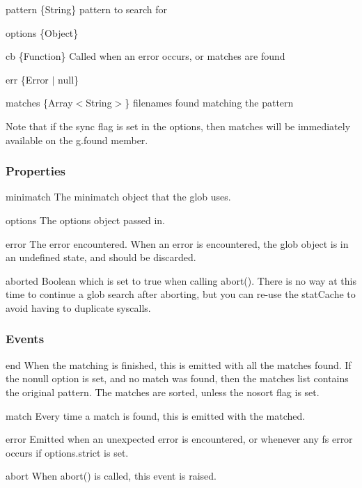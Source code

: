 \begin{DoxyItemize}
\item {\ttfamily pattern} \{String\} pattern to search for
\item {\ttfamily options} \{Object\}
\item {\ttfamily cb} \{Function\} Called when an error occurs, or matches are found
\begin{DoxyItemize}
\item {\ttfamily err} \{Error $\vert$ null\}
\item {\ttfamily matches} \{Array$<$\+String$>$\} filenames found matching the pattern
\end{DoxyItemize}
\end{DoxyItemize}

Note that if the {\ttfamily sync} flag is set in the options, then matches will be immediately available on the {\ttfamily g.\+found} member.

\subsubsection*{Properties}


\begin{DoxyItemize}
\item {\ttfamily minimatch} The minimatch object that the glob uses.
\item {\ttfamily options} The options object passed in.
\item {\ttfamily error} The error encountered. When an error is encountered, the glob object is in an undefined state, and should be discarded.
\item {\ttfamily aborted} Boolean which is set to true when calling {\ttfamily abort()}. There is no way at this time to continue a glob search after aborting, but you can re-\/use the stat\+Cache to avoid having to duplicate syscalls.
\end{DoxyItemize}

\subsubsection*{Events}


\begin{DoxyItemize}
\item {\ttfamily end} When the matching is finished, this is emitted with all the matches found. If the {\ttfamily nonull} option is set, and no match was found, then the {\ttfamily matches} list contains the original pattern. The matches are sorted, unless the {\ttfamily nosort} flag is set.
\item {\ttfamily match} Every time a match is found, this is emitted with the matched.
\item {\ttfamily error} Emitted when an unexpected error is encountered, or whenever any fs error occurs if {\ttfamily options.\+strict} is set.
\item {\ttfamily abort} When {\ttfamily abort()} is called, this event is raised.
\end{DoxyItemize}

